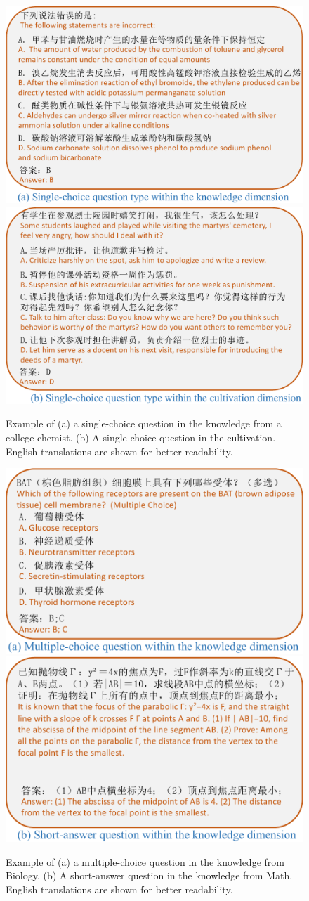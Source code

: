 \begin{figure}[tbp]
    \centering
    \includegraphics[height=0.32\textwidth]{figure/omni1.pdf}
    \includegraphics[height=0.32\textwidth]{figure/omni2.pdf}
    \vspace{-3mm}
    \caption{Example of (a) a single-choice question in the knowledge from a college chemist. (b) A single-choice question in the cultivation. English translations are shown for better readability.}
    \label{fig:omni12}
    \vspace{-3mm}
\end{figure}

\begin{figure}[tbp]
    \centering
    \includegraphics[height=0.3\textwidth]{figure/omni3.pdf}
    \includegraphics[height=0.3\textwidth]{figure/omni4.pdf}
    \vspace{-3mm}
    \caption{Example of (a) a multiple-choice question in the knowledge from Biology. (b) A short-answer question in the knowledge from Math. English translations are shown for better readability.}
    \label{fig:omni34}
    \vspace{-3mm}
\end{figure}





